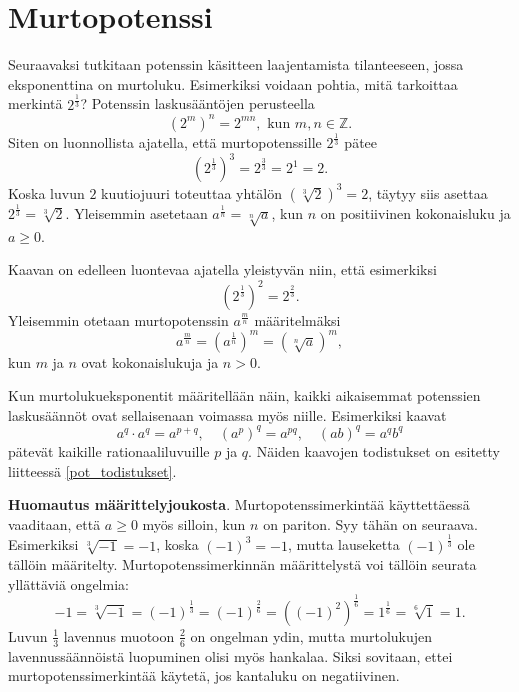 \chapter{Murtopotenssi}

Seuraavaksi tutkitaan potenssin käsitteen laajentamista tilanteeseen, jossa eksponenttina on murtoluku.
Esimerkiksi voidaan pohtia, mitä tarkoittaa merkintä $2^\frac{1}{3}$? Potenssin laskusääntöjen perusteella
\[
(2^{m})^n = 2^{mn},\textrm{ kun }m,n\in \mathbb{Z}.
\]
Siten on luonnollista ajatella, että murtopotenssille $2^\frac{1}{3}$ pätee
\[
(2^\frac{1}{3})^3 = 2^\frac{3}{3} = 2^1=2.
\]
Koska luvun $2$ kuutiojuuri toteuttaa yhtälön $(\sqrt[3]{2})^3=2$, täytyy siis asettaa $2^\frac{1}{3}=\sqrt[3]{2}$. Yleisemmin asetetaan $a^\frac{1}{n} =\sqrt[n]{a}$, kun $n$ on positiivinen kokonaisluku ja $a\ge 0$.

Kaavan on edelleen luontevaa ajatella yleistyvän niin, että esimerkiksi
\[
(2^{\frac{1}{3}})^2 = 2^{\frac{2}{3}}.
\]
Yleisemmin otetaan murtopotenssin $a^\frac{m}{n}$ määritelmäksi
\[
a^\frac{m}{n} = (a^{\frac{1}{n}})^m = (\sqrt[n]{a})^m,
\]
kun $m$ ja $n$ ovat kokonaislukuja ja $n>0$. 



Kun murtolukueksponentit määritellään näin, kaikki aikaisemmat potenssien
laskusäännöt ovat sellaisenaan voimassa myös niille. Esimerkiksi kaavat
\[ a^q\cdot a^q = a^{p+q}, \quad (a^p)^q = a^{pq}, \quad (ab)^q=a^qb^q \]
pätevät kaikille rationaaliluvuille $p$ ja $q$.  Näiden kaavojen todistukset on esitetty liitteessä \ref{pot_todistukset}.

{\bf Huomautus määrittelyjoukosta}. Murtopotenssimerkintää käyttettäessä vaaditaan, että $a\geq 0$ myös silloin, kun $n$ on pariton. Syy tähän on seuraava. Esimerkiksi $\sqrt[3]{-1}=-1$, koska $(-1)^3=-1$, mutta lauseketta $(-1)^\frac{1}{3}$ ole tällöin määritelty. Murtopotenssimerkinnän määrittelystä voi tällöin seurata yllättäviä ongelmia:
\[
 -1 = \sqrt[3]{-1} = (-1)^\frac{1}{3} = (-1)^\frac{2}{6}
= ((-1)^2)^\frac{1}{6} = 1^\frac{1}{6} = \sqrt[6]{1} = 1. 
\]
Luvun $\frac{1}{3}$ lavennus muotoon $\frac{2}{6}$ on ongelman ydin, mutta murtolukujen lavennussäännöistä luopuminen olisi myös hankalaa. Siksi sovitaan, ettei murtopotenssimerkintää käytetä, jos kantaluku on negatiivinen.

